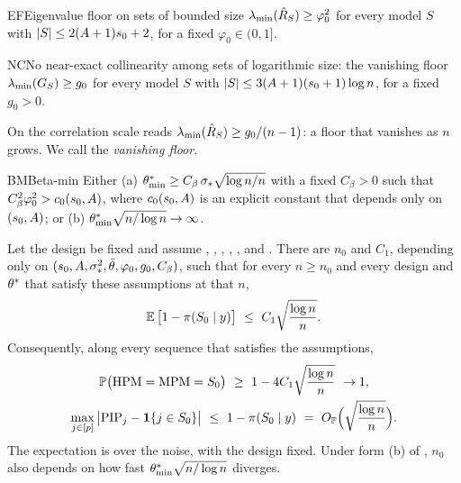 \begin{assumption}{EF}{Eigenvalue floor on sets of bounded size}
$\lambda_{\min}(\hat R_S)\ge\varphi_0^2$ for every model $S$ with $\lvert S\rvert\le2(A+1)s_0+2$, for a fixed $\varphi_0\in(0,1]$.
\end{assumption}

\begin{assumption}{NC}{No near-exact collinearity among sets of logarithmic size: the vanishing floor}
$\lambda_{\min}(G_S)\ge g_0$ for every model $S$ with $\lvert S\rvert\le3(A+1)(s_0+1)\log n$, for a fixed $g_0>0$.
\end{assumption}

On the correlation scale  reads $\lambda_{\min}(\hat R_S)\ge g_0/(n-1)$: a floor that vanishes as $n$ grows. We call 
the \emph{vanishing floor}.

\begin{assumption}{BM}{Beta-min}
Either (a) $\theta^*_{\min}\ge C_\beta\,\sigma_*\sqrt{\log n/n}$ with a fixed $C_\beta>0$ such that $C_\beta^2\varphi_0^2>c_0(s_0,A)$, where
$c_0(s_0,A)$ is an explicit constant that depends only on $(s_0,A)$; or (b) $\theta^*_{\min}\sqrt{n/\log n}\to\infty$.
\end{assumption}

\begin{theorem}\label{thm:post-fixed}
Let the design be fixed and assume , , , , ,  and . There are $n_0$
and $C_1$, depending only on $(s_0,A,\sigma_*^2,\bar\theta,\varphi_0,g_0,C_\beta)$, such that for every $n\ge n_0$ and every
design and $\theta^*$ that satisfy these assumptions at that $n$,
\begin{equation}\label{eq:post-exp}
  \operatorname{\mathbb{E}}\big[1-\pi(S_0\mid y)\big]\ \le\ C_1\sqrt{\frac{\log n}{n}} .
\end{equation}
Consequently, along every sequence that satisfies the assumptions,
\begin{gather}
  \P\big(\HPM=\MPM=\Sz\big)\ \ge\ 1-4C_1\sqrt{\frac{\log n}{n}}\ \to1,\label{eq:post-hpm}\\
  \max_{j\in\set{p}}\big|\PIP_j-\ind{j\in\Sz}\big|\ \le\ 1-\pis{\Sz}\ =\ \OP\Big(\sqrt{\frac{\log n}{n}}\Big).\label{eq:post-op}
\end{gather}
The expectation is over the noise, with the design fixed. Under form (b) of , $n_0$ also depends on how fast
$\theta^*_{\min}\sqrt{n/\log n}$ diverges.
\end{theorem}

